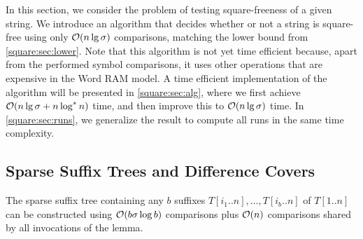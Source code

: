 \label{square:sec:upper}

In this section, we consider the problem of testing square-freeness of a given string.
We introduce an algorithm that decides whether or not a string is square-free using only $\mathcal{O}(n \lg \sigma)$ comparisons, matching the lower bound from \cref{square:sec:lower}.
Note that this algorithm is not yet time efficient because, apart from the performed symbol comparisons, it uses other operations that are expensive in the Word RAM model.
A time efficient implementation of the algorithm will be presented in \cref{square:sec:alg}, where we first achieve $\mathcal{O}(n \lg \sigma + n \log^* n)$ time, and then improve this to $\mathcal{O}(n \lg \sigma)$ time.
In \cref{square:sec:runs}, we generalize the result to compute all runs in the same time complexity.

\subsection{Sparse Suffix Trees and Difference Covers}

\begin{lemma}
\label{lem:sparse}
The sparse suffix tree containing any $b$ suffixes $T[i_{1}..n], \ldots, T[i_{b}..n]$
of $T[1..n]$ can be constructed using $\mathcal{O}(b\sigma\log b)$ comparisons plus
$\mathcal{O}(n)$ comparisons shared by all invocations of the lemma.
\end{lemma}

